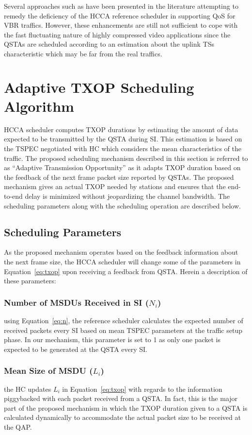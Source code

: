 \documentclass[a4paper, conference]{IEEEtran}
\begin{document}
\hspace{1mm}Several approaches such as \cite{Lee2009, Jansang2011, Cecchetti2012, cecchettielAL2012, ruscelli2013} have been presented in the literature attempting to remedy the deficiency of the HCCA reference scheduler in supporting QoS for VBR traffics. However, these enhancements are still not sufficient to cope with the fast fluctuating nature of highly compressed video applications since the QSTAs are scheduled according to an estimation about the uplink TSs characteristic which may be far from the real traffics.

\section{Adaptive TXOP Scheduling Algorithm}
\label{sec:ATAV}
HCCA scheduler computes TXOP durations by estimating the amount of data expected to be transmitted by the QSTA during SI. This estimation is based on the TSPEC negotiated with HC which considers the mean characteristics of the traffic. The proposed scheduling mechanism described in this section is referred to as “Adaptive Transmission Opportunity” as it adapts TXOP duration based on the feedback of the next frame packet size reported by QSTAs. The proposed mechanism gives an actual TXOP needed by stations and ensures that the end-to-end delay is minimized without jeopardizing the channel bandwidth. The scheduling parameters along with the scheduling operation are described below.

\subsection{Scheduling Parameters}
As the proposed mechanism operates based on the feedback information about the next frame size, the HCCA scheduler will change  some of the parameters in Equation~\eqref{eq:txop} upon receiving a feedback from QSTA. Herein a description of these parameters:

\subsubsection{Number of MSDUs Received in SI ($N_{i}$)} using Equation~\eqref{eq:n}, the reference scheduler calculates the expected number of received packets every SI based on mean TSPEC parameters at the traffic setup phase. In our mechanism, this parameter is set to 1 as only one packet is expected to be generated at the QSTA every SI.
\label{enm:N_i}
\subsubsection{Mean Size of MSDU ($L_{i}$)} the HC updates $L_{i}$ in Equation~\eqref{eq:txop} with regards to the information piggybacked with each packet received from a QSTA. In fact, this is the major part of the proposed mechanism in which the TXOP duration given to a QSTA is calculated dynamically to accommodate the actual packet size to be received at the QAP.
\label{enm:L_i}
\end{document}
